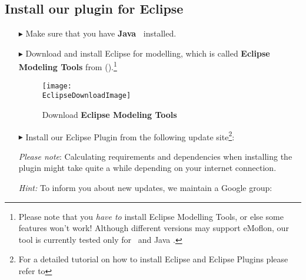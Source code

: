 \genHeader
\hypertarget{installPlugin common}{} 
\subsection{Install our plugin for Eclipse}
 
\vspace{0.5cm}
 
\begin{itemize}

\item[$\blacktriangleright$] Make sure that you have \textbf{Java~\JavaVersion{}} installed.
 
\item[$\blacktriangleright$] Download and install Eclipse \EclipseVersion for modelling, which is called \textbf{Eclipse Modeling Tools} from \EclipseDownloadLink ().\footnote{Please
note that you \emph{have to} install Eclipse Modelling Tools, or else some features won't work! Although different versions may support eMoflon, our tool is
currently tested only for \EclipseVersion~and Java \JavaVersion.} 

\begin{figure}[htbp]
	\centering
  	\texttt{[image: \\EclipseDownloadImage]}
	\caption{Download \textbf{Eclipse Modeling Tools}}
	\label{eclipseDownload}
\end{figure}

\vspace{0.9cm}

\item[$\blacktriangleright$] Install our Eclipse Plugin from the following update site\footnote{For a detailed tutorial on how to install Eclipse and Eclipse
Plugins please refer to }:\\ \eMoflonUpdateSite

\emph{Please note}: Calculating requirements and dependencies when
installing the plugin might take quite a while depending on your internet connection.

\emph{Hint:} To inform you about new updates, we maintain a Google group: 
\end{itemize}
